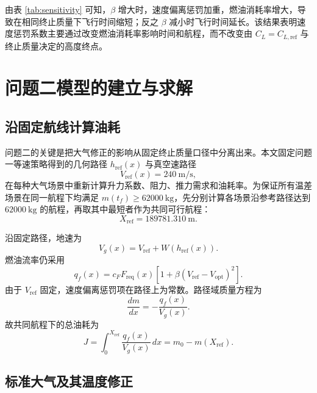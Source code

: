 \documentclass[withoutpreface,bwprint]{cumcmthesis}
\begin{document}
由表 \ref{tab:sensitivity} 可知，$\beta$ 增大时，速度偏离惩罚加重，燃油消耗率增大，导致在相同终止质量下飞行时间缩短；反之 $\beta$ 减小时飞行时间延长。该结果表明速度惩罚系数主要通过改变燃油消耗率影响时间和航程，而不改变由 $C_L=C_{L,\mathrm{ref}}$ 与终止质量决定的高度终点。

\section{问题二模型的建立与求解}

\subsection{沿固定航线计算油耗}

问题二的关键是把大气修正的影响从固定终止质量口径中分离出来。本文固定问题一等速策略得到的几何路径 $h_{\mathrm{ref}}(x)$ 与真空速路径
\begin{equation}
V_{\mathrm{ref}}(x)=240\ \mathrm{m/s},
\end{equation}
在每种大气场景中重新计算升力系数、阻力、推力需求和油耗率。为保证所有温差场景在同一航程下均满足 $m(t_f)\geq 62000\ \mathrm{kg}$，先分别计算各场景沿参考路径达到 $62000\ \mathrm{kg}$ 的航程，再取其中最短者作为共同可行航程：
\begin{equation}
X_{\mathrm{ref}}=189781.310\ \mathrm{m}.
\label{eq:q2_Xref}
\end{equation}

沿固定路径，地速为
\begin{equation}
V_g(x)=V_{\mathrm{ref}}+W(h_{\mathrm{ref}}(x)).
\end{equation}
燃油流率仍采用
\begin{equation}
q_f(x)=c_F F_{\mathrm{req}}(x)\left[1+\beta(V_{\mathrm{ref}}-V_{\mathrm{opt}})^2\right].
\label{eq:q2_fuel_flow}
\end{equation}
由于 $V_{\mathrm{ref}}$ 固定，速度偏离惩罚项在路径上为常数。路径域质量方程为
\begin{equation}
\frac{dm}{dx}=-\frac{q_f(x)}{V_g(x)}.
\label{eq:q2_dmdx}
\end{equation}
故共同航程下的总油耗为
\begin{equation}
J=\int_0^{X_{\mathrm{ref}}}\frac{q_f(x)}{V_g(x)}\,dx
=m_0-m(X_{\mathrm{ref}}).
\label{eq:q2_path_integral}
\end{equation}

\subsection{标准大气及其温度修正}
\end{document}
